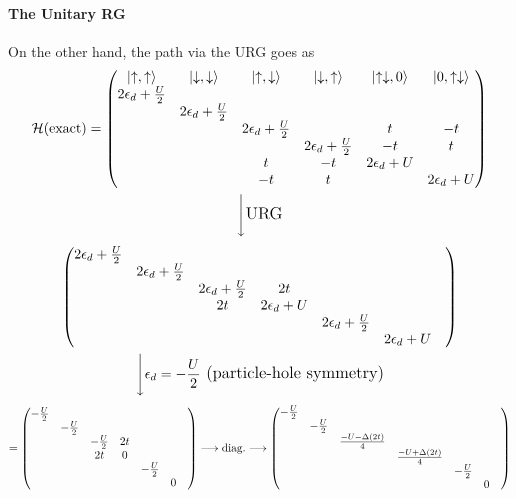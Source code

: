 \documentclass[12pt]{article}
\begin{document}
\paragraph{The Unitary RG}
On the other hand, the path via the URG goes as
\begin{gather*}
	\mathcal{H}(\text{exact}) = \begin{pmatrix}\ket{\uparrow,\uparrow} &\ket{\downarrow,\downarrow} &\ket{\uparrow,\downarrow} & \ket{\downarrow,\uparrow} &\ket{\uparrow\downarrow,0} &\ket{0,\uparrow\downarrow} \\ 
	2\epsilon_d+\frac{U}{2} &&&&& \\
	& 2\epsilon_d+\frac{U}{2} &&&&\\
	&& 2\epsilon_d+\frac{U}{2} && t & -t \\ 
	&&& 2\epsilon_d+\frac{U}{2} & -t & t \\
	&& t & -t & 2\epsilon_d+U & \\
	&& -t & t && 2\epsilon_d+U 
	\end{pmatrix}\\
		\Bigg\downarrow {\large{\text{URG}}}
\end{gather*}
\begin{gather*}
	\begin{pmatrix} 
	2\epsilon_d+\frac{U}{2} &&&&& \\
	& 2\epsilon_d+\frac{U}{2} &&&&\\
	&& 2\epsilon_d+\frac{U}{2} & 2t &&& \\ 
	&& 2t & 2\epsilon_d+U &&& \\
	&&&& 2\epsilon_d+\frac{U}{2} & \\
	&&&&& 2\epsilon_d+U & 
	\end{pmatrix}\\
	\Bigg\downarrow {\large{\epsilon_d = -\ensuremath{\frac{U}{2}}}\text{  (particle-hole symmetry)}}
\end{gather*}
\begin{gather*}
	= \begin{pmatrix} 
	-\frac{U}{2} &&&&& \\
	& -\frac{U}{2} &&&&\\
	&& -\frac{U}{2} & 2t &&& \\ 
	&& 2t & 0 &&& \\
	&&&& -\frac{U}{2} & \\
	&&&&& 0 & 
	\end{pmatrix}
	\longrightarrow\text{diag.}\longrightarrow
	\begin{pmatrix} 
	-\frac{U}{2} &&&&& \\
	& -\frac{U}{2} &&&&\\
	&& \frac{-U-\Delta(2t)}{4} &&&& \\ 
	&&& \frac{-U+\Delta(2t)}{4} &&& \\
	&&&& -\frac{U}{2} & \\
	&&&&& 0 & 
	\end{pmatrix}
\end{gather*}
\end{document}
